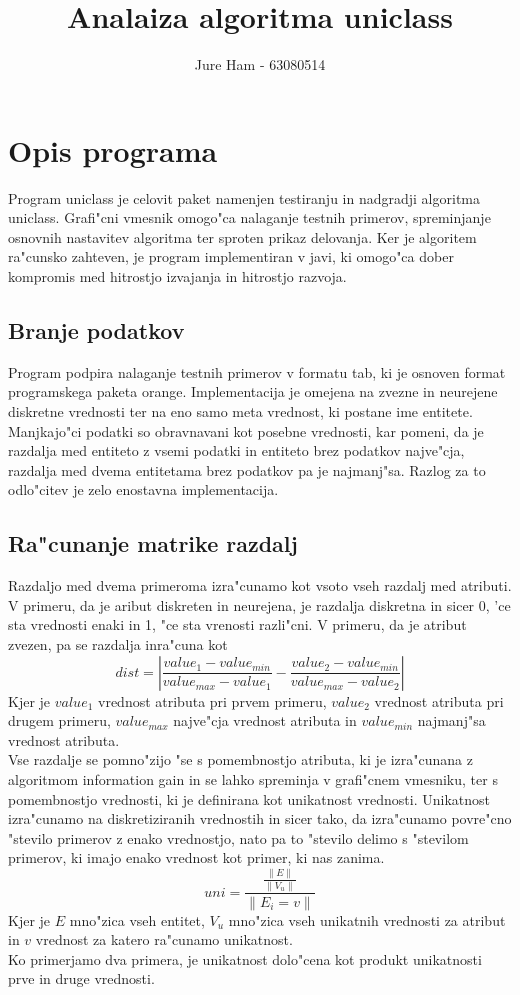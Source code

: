 \documentclass[a4paper]{article}
\title{Analaiza algoritma uniclass}
\author{Jure Ham - 63080514}
\begin{document}
\tableofcontents
\pagebreak

\section{Opis programa}
	Program uniclass je celovit paket namenjen testiranju in nadgradji algoritma uniclass. Grafi"cni vmesnik omogo"ca nalaganje testnih primerov, spreminjanje osnovnih nastavitev algoritma ter sproten prikaz delovanja. Ker je algoritem ra"cunsko zahteven, je program implementiran v javi, ki omogo"ca dober kompromis med hitrostjo izvajanja in hitrostjo razvoja.

	\subsection{Branje podatkov}
		Program podpira nalaganje testnih primerov v formatu tab, ki je osnoven format programskega paketa orange. Implementacija je omejena na zvezne in neurejene diskretne vrednosti ter na eno samo meta vrednost, ki postane ime entitete. \\
		Manjkajo"ci podatki so obravnavani kot posebne vrednosti, kar pomeni, da je razdalja med entiteto z vsemi podatki in entiteto brez podatkov najve"cja, razdalja med dvema entitetama brez podatkov pa je najmanj"sa. Razlog za to odlo"citev je zelo enostavna implementacija.
	
	\subsection{Ra"cunanje matrike razdalj}
		Razdaljo med dvema primeroma izra"cunamo kot vsoto vseh razdalj med atributi. V primeru, da je aribut diskreten in neurejena, je razdalja diskretna in sicer 0, 'ce sta vrednosti enaki in 1, "ce sta vrenosti razli"cni. V primeru, da je atribut zvezen, pa se razdalja inra"cuna kot $$ dist = \left|\frac{value_1 - value_{min}}{value_{max} - value_1} - \frac{value_2 - value_{min}}{value_{max} - value_2}\right| $$
		Kjer je $value_1$ vrednost atributa pri prvem primeru, $value_2$ vrednost atributa pri drugem primeru, $value_{max}$ najve"cja vrednost atributa in $value_{min}$ najmanj"sa vrednost atributa.\\
		Vse razdalje se pomno"zijo "se s pomembnostjo atributa, ki je izra"cunana z algoritmom information gain in se lahko spreminja v grafi"cnem vmesniku, ter s pomembnostjo vrednosti, ki je definirana kot unikatnost vrednosti. Unikatnost izra"cunamo na diskretiziranih vrednostih in sicer tako, da izra"cunamo povre"cno "stevilo primerov z enako vrednostjo, nato pa to "stevilo delimo s "stevilom primerov, ki imajo enako vrednost kot primer, ki nas zanima. 
		$$ uni = \frac{\frac{\parallel E \parallel}{\parallel V_u \parallel}}{\parallel E_i=v \parallel} $$
		Kjer je $E$ mno"zica vseh entitet, $V_u$ mno"zica vseh unikatnih vrednosti za atribut in $v$ vrednost za katero ra"cunamo unikatnost.\\
		Ko primerjamo dva primera, je unikatnost dolo"cena kot produkt unikatnosti prve in druge vrednosti.
		
\end{document}
